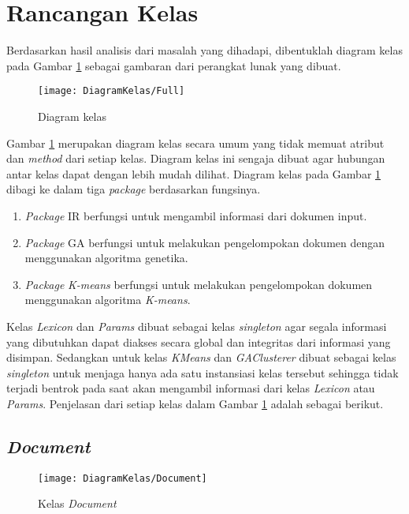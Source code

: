 \newpage
\section{Rancangan Kelas}
Berdasarkan hasil analisis dari masalah yang dihadapi, dibentuklah diagram kelas pada Gambar \ref{fig:diagramkelas} sebagai gambaran dari perangkat lunak yang dibuat.

\begin{figure}[H]
	\begin{center}
		\texttt{[image: DiagramKelas/Full]}
		\caption{Diagram kelas}
		\label{fig:diagramkelas}
	\end{center}
\end{figure}

Gambar \ref{fig:diagramkelas} merupakan diagram kelas secara umum yang tidak memuat atribut dan \textit{method} dari setiap kelas. Diagram kelas ini sengaja dibuat agar hubungan antar kelas dapat dengan lebih mudah dilihat. Diagram kelas pada Gambar \ref{fig:diagramkelas} dibagi ke dalam tiga \textit{package} berdasarkan fungsinya.

\begin{enumerate}
	\item \textit{Package} IR berfungsi untuk mengambil informasi dari dokumen input. 
	\item \textit{Package} GA berfungsi untuk melakukan pengelompokan dokumen dengan menggunakan algoritma genetika. 
	\item \textit{Package} \textit{K-means} berfungsi untuk melakukan pengelompokan dokumen menggunakan algoritma \textit{K-means}.
\end{enumerate}

Kelas \textit{Lexicon} dan \textit{Params} dibuat sebagai kelas \textit{singleton} agar segala informasi yang dibutuhkan dapat diakses secara global dan integritas dari informasi yang disimpan. Sedangkan untuk kelas \textit{KMeans} dan \textit{GAClusterer} dibuat sebagai kelas \textit{singleton} untuk menjaga hanya ada satu instansiasi kelas tersebut sehingga tidak terjadi bentrok pada saat akan mengambil informasi dari kelas \textit{Lexicon} atau \textit{Params}. Penjelasan dari setiap kelas dalam Gambar \ref{fig:diagramkelas} adalah sebagai berikut.

\subsection{\textit{Document}}

\begin{figure}[H]
	\begin{center}
		\texttt{[image: DiagramKelas/Document]}
		\caption{Kelas \textit{Document}}
		\label{fig:kelasDocument}
	\end{center}
\end{figure}


